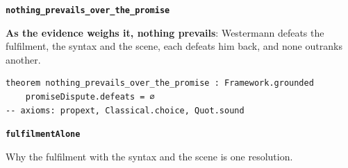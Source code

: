 \documentclass[11pt]{article}
\begin{document}
\par\medskip\noindent\textbf{\texttt{nothing\_\allowbreak{}prevails\_\allowbreak{}over\_\allowbreak{}the\_\allowbreak{}promise}}\par\nobreak\noindent
\textbf{As the evidence weighs it, nothing prevails}: Westermann defeats the fulfilment, the syntax and the scene, each defeats him back, and none outranks another.

{\small\begin{verbatim}
theorem nothing_prevails_over_the_promise : Framework.grounded
    promiseDispute.defeats = ∅
-- axioms: propext, Classical.choice, Quot.sound
\end{verbatim}}
\par\medskip\noindent\textbf{\texttt{fulfilment\allowbreak{}Alone}}\par\nobreak\noindent
Why the fulfilment with the syntax and the scene is one resolution.
\end{document}
